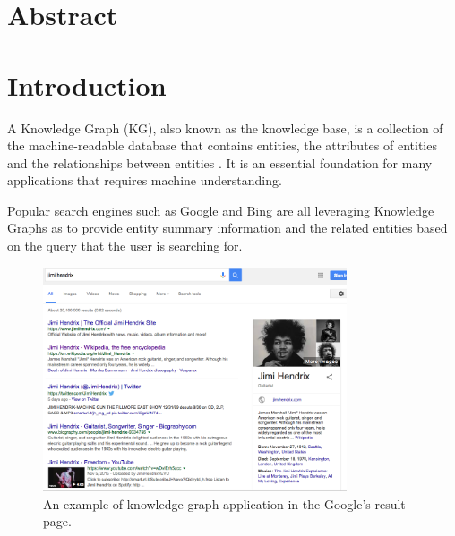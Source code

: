 \documentclass[11pt,a4paper,openright]{memoir}
\title{\theTitle}
\author{\theAuthor}
\begin{document}
\setlength\parindent{24pt}
\captionnamefont{\bfseries}

\frontmatter

\makeunswfrontmatter

\newpage
\thispagestyle{empty}
\strut
\vfill


\chapter*{Abstract}

\clearpage
\tableofcontents

\cleardoublepage

\mainmatter

\chapter{Introduction}
A Knowledge Graph (KG), also known as the knowledge base, is a collection of the machine-readable database that contains entities, the attributes of entities and the relationships between entities \cite{google}. It is an essential foundation for many applications that requires machine understanding.

Popular search engines such as Google \cite{google} and Bing \cite{bing} are all leveraging Knowledge Graphs as to provide entity summary information and the related entities based on the query that the user is searching for.

\begin{figure}[!htbp]
  \centering
    \includegraphics[width=0.8\textwidth]{./images/google_knowledge_graph}
  \caption[An example of knowledge graph application.]{An example of knowledge graph application in the Google's result page.}
  \label{fig:google_knowledge_graph}
\end{figure}
\end{document}
